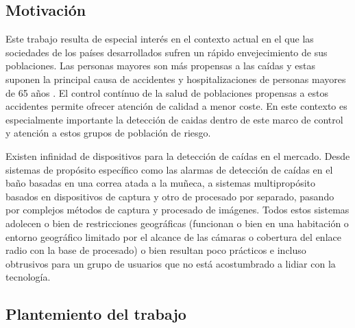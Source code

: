 \documentclass[../tfm.tex]{subfiles}
\begin{document}

\subsection{Motivación}

Este trabajo resulta de especial interés en el contexto actual en el que las sociedades de los países desarrollados sufren un rápido envejecimiento de sus poblaciones. Las personas mayores son más propensas a las caídas y estas suponen la principal causa de accidentes y hospitalizaciones de personas mayores de 65 años . El control contínuo de la salud de poblaciones propensas a estos accidentes permite ofrecer atención de calidad a menor coste. En este contexto es especialmente importante la detección de caidas dentro de este marco de control y atención a estos grupos de población de riesgo.

Existen infinidad de dispositivos para la detección de caídas en el mercado. Desde sistemas de propósito específico como las alarmas de detección de caídas en el baño basadas en una correa atada a la muñeca, a sistemas multipropósito basados en dispositivos de captura y otro de procesado por separado, pasando por complejos métodos de captura y procesado de imágenes. Todos estos sistemas adolecen o bien de restricciones geográficas (funcionan o bien en una habitación o entorno geográfico limitado por el alcance de las cámaras o cobertura del enlace radio con la base de procesado) o bien resultan poco prácticos e incluso obtrusivos para un grupo de usuarios que no está acostumbrado a lidiar con la tecnología.

\subsection{Plantemiento del trabajo}
\end{document}
